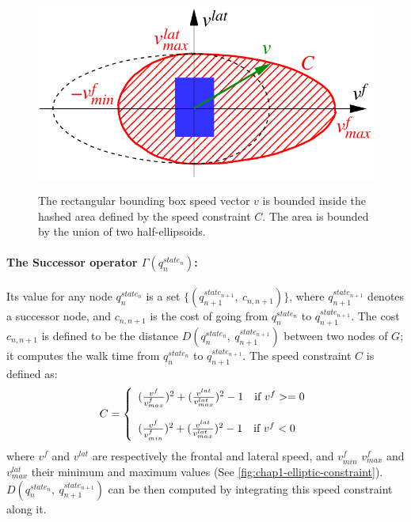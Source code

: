 \begin{figure}
  \centering
      {\includegraphics[width = 0.75\linewidth]
        {src/chap1-path-optimization/elliptic-constraint.pdf}}
      \caption{The rectangular bounding box speed vector $v$ is
        bounded inside the hashed area defined by the speed constraint
        $C$. The area is bounded by the union of two half-ellipsoids.}
      \label{fig:chap1-elliptic-constraint}
\end{figure}

\paragraph{The Successor operator $\Gamma(q_n^{state_n})$:}
Its value for any node $q_n^{state_n}$ is a set
$\{(q_{n+1}^{state_{n+1}},~c_{n,n+1})\}$, where
$q_{n+1}^{state_{n+1}}$ denotes a successor node, and $c_{n,n+1}$ is
the cost of going from $q_n^{state_n}$ to $q_{n+1}^{state_{n+1}}$. The
cost $c_{n,n+1}$ is defined to be the distance
$D(q_n^{state_n},~q_{n+1}^{state_{n+1}})$ between two nodes of $G$; it
computes the walk time from $q_n^{state_n}$ to
$q_{n+1}^{state_{n+1}}$. The speed constraint $C$ is defined as:
\begin{equation}
C = \left\{
\begin{array}{l l l}
  (\frac{v^{f}}{v_{max}^{f}})^2 +
  (\frac{v^{lat}}{v_{max}^{lat}})^2 - 1
  \quad \text{if } v^f >= 0 \\

  \\

  (\frac{v^{f}}{v_{min}^{f}})^2 +
  (\frac{v^{lat}}{v_{max}^{lat}})^2 - 1
  \quad \text{if } v^f < 0
\end{array} \right.
\end{equation}
where $v^{f}$ and $v^{lat}$ are respectively the frontal and lateral
speed, and $v_{min}^f$ $v_{max}^{f}$ and $v_{max}^{lat}$ their minimum
and maximum values (See
\autoref{fig:chap1-elliptic-constraint}). $D(q_n^{state_n},~q_{n+1}^{state_{n+1}})$
can be then computed by integrating this speed constraint along it.

